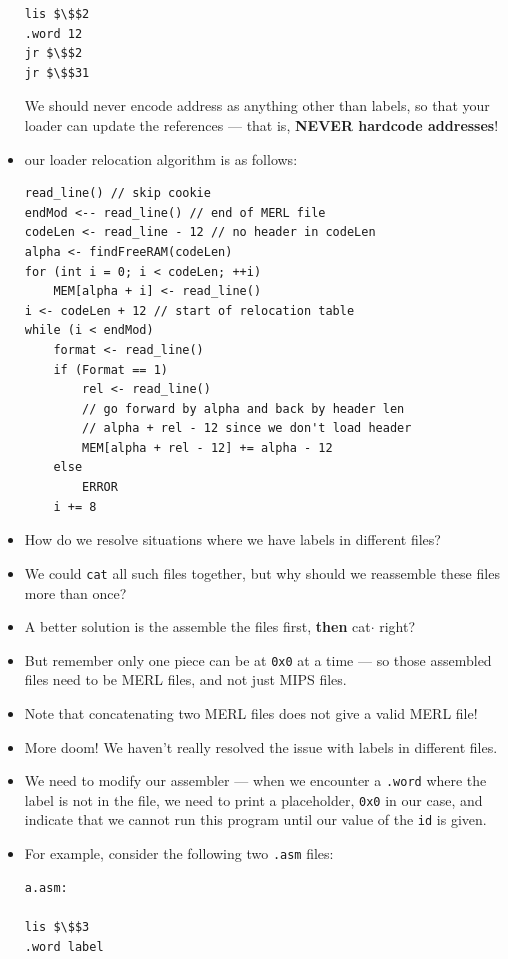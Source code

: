 \documentclass[12pt]{article}
\begin{document}
\begin{itemize}
\begin{lstlisting}[mathescape, numbers=none, breaklines=true]
lis $\$$2
.word 12
jr $\$$2
jr $\$$31
\end{lstlisting}
    We should never encode address as anything other than labels, so that your loader can update the references --- that is, \textbf{NEVER hardcode addresses}!
    \item our loader relocation algorithm is as follows:
\begin{lstlisting}[mathescape, numbers=none, breaklines=true]
read_line() // skip cookie
endMod <-- read_line() // end of MERL file
codeLen <- read_line - 12 // no header in codeLen
alpha <- findFreeRAM(codeLen)
for (int i = 0; i < codeLen; ++i) 
    MEM[alpha + i] <- read_line()
i <- codeLen + 12 // start of relocation table
while (i < endMod)
    format <- read_line()
    if (Format == 1)
        rel <- read_line()
        // go forward by alpha and back by header len
        // alpha + rel - 12 since we don't load header
        MEM[alpha + rel - 12] += alpha - 12
    else
        ERROR
    i += 8
\end{lstlisting}
    \item How do we resolve situations where we have labels in different files?
    \item We could \lstinline[mathescape]{cat} all such files together, but why should we reassemble these files more than once?
    \item A better solution is the assemble the files first, \textbf{then} cat$\cdot$ right?
    \item But remember only one piece can be at \lstinline[mathescape]{0x0} at a time --- so those assembled files need to be MERL files, and not just MIPS files.
    \item Note that concatenating two MERL files does not give a valid MERL file!
    \item More doom!  We haven't really resolved the issue with labels in different files.  
    \item We need to modify our assembler --- when we encounter a \lstinline[mathescape]{.word} where the label is not in the file, we need to print a placeholder, \lstinline[mathescape]{0x0} in our case, and indicate that we cannot run this program until our value of the \lstinline[mathescape]{id} is given.
    \item For example, consider the following two \lstinline[mathescape]{.asm} files:
\begin{lstlisting}[mathescape, numbers=none, breaklines=true]
a.asm:

lis $\$$3
.word label


\end{lstlisting}
\end{itemize}
\end{document}
